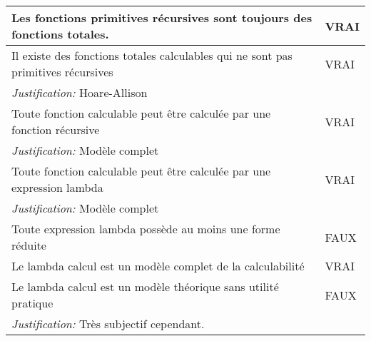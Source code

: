 \begin{tabular}{p{13cm}|l}
    Les fonctions primitives récursives sont toujours des fonctions totales.& VRAI \\
    \hline
    Il existe des fonctions totales calculables qui ne sont pas primitives récursives & VRAI \\
    \textit{Justification:} Hoare-Allison & \\
    \hline
    Toute fonction calculable peut être calculée par une fonction récursive& VRAI \\
    \textit{Justification:} Modèle complet & \\
    \hline
    Toute fonction calculable peut être calculée par une expression lambda& VRAI\\
    \textit{Justification:} Modèle complet & \\
    \hline
    Toute expression lambda possède au moins une forme réduite & FAUX \\
    \hline
    Le lambda calcul est un modèle complet de la calculabilité & VRAI \\
    \hline
    Le lambda calcul est un modèle théorique sans utilité pratique & FAUX \\
    \textit{Justification:} Très subjectif cependant.& \\

\end{tabular}

